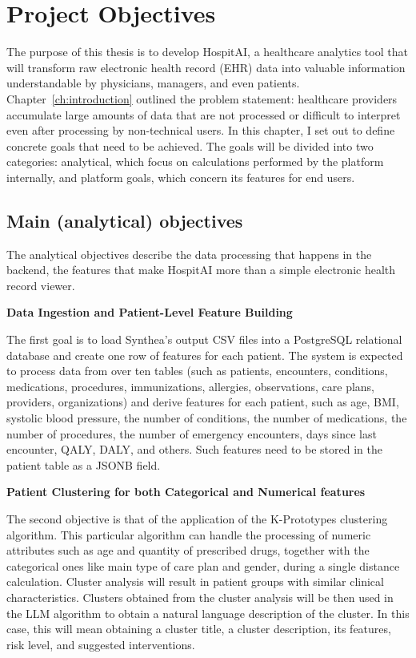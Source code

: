 \chapter{Project Objectives}\label{ch:objectives}

The purpose of this thesis is to develop HospitAI, a healthcare analytics tool that will transform raw electronic health record (EHR) data into valuable information understandable by physicians, managers, and even patients. Chapter~\ref{ch:introduction} outlined the problem statement: healthcare providers accumulate large amounts of data that are not processed or difficult to interpret even after processing by non-technical users. In this chapter, I set out to define concrete goals that need to be achieved. The goals will be divided into two categories: analytical, which focus on calculations performed by the platform internally, and platform goals, which concern its features for end users.

\section{Main (analytical) objectives}

The analytical objectives describe the data processing that happens in the backend, the features that make HospitAI more than a simple electronic health record viewer.

\vspace{0.5em}
\noindent\textbf{Data Ingestion and Patient-Level Feature Building}

The first goal is to load Synthea's output CSV files into a PostgreSQL relational database and create one row of features for each patient. The system is expected to process data from over ten tables (such as patients, encounters, conditions, medications, procedures, immunizations, allergies, observations, care plans, providers, organizations) and derive features for each patient, such as age, BMI, systolic blood pressure, the number of conditions, the number of medications, the number of procedures, the number of emergency encounters, days since last encounter, QALY, DALY, and others. Such features need to be stored in the patient table as a JSONB field.

\vspace{0.5em}
\noindent\textbf{Patient Clustering for both Categorical and Numerical features}

The second objective is that of the application of the K-Prototypes clustering algorithm. This particular algorithm can handle the processing of numeric attributes such as age and quantity of prescribed drugs, together with the categorical ones like main type of care plan and gender, during a single distance calculation. Cluster analysis will result in patient groups with similar clinical characteristics. Clusters obtained from the cluster analysis will be then used in the LLM algorithm to obtain a natural language description of the cluster. In this case, this will mean obtaining a cluster title, a cluster description, its features, risk level, and suggested interventions.


